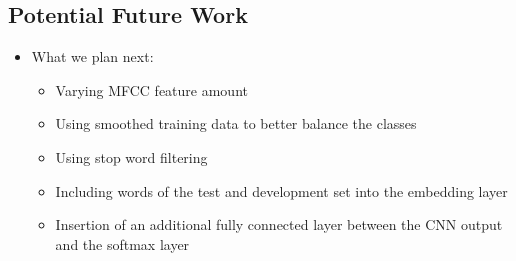 \documentclass[a0,landscape]{a0poster}
\begin{document}
\begin{multicols}{3}
\color{Black} %
\large

\section*{Potential Future Work}

\begin{itemize}
	\item What we plan next:
	\begin{itemize}
		\item Varying MFCC feature amount
		\item Using smoothed training data to better balance the classes
		\item Using stop word filtering 
		\item Including words of the test and development set into the embedding layer
		\item Insertion of an additional fully connected layer between the CNN output and the softmax layer
	
	\end{itemize}		
\end{itemize}


%
\nocite{*} %
%
%
%
%

\end{multicols}
\end{document}
